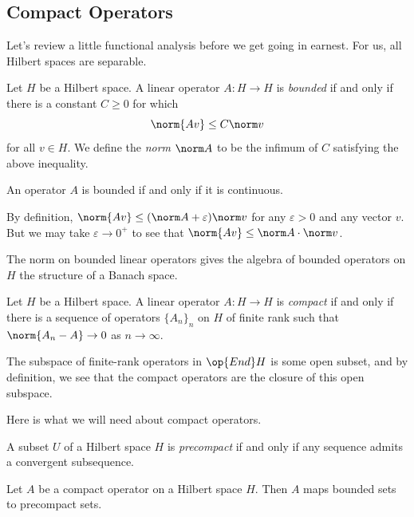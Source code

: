 \documentclass[../notes.tex]{subfiles}
\begin{document}
\subsection{Compact Operators}
Let's review a little functional analysis before we get going in earnest. For us, all Hilbert spaces are separable.
\begin{definition}[bounded]
	Let $H$ be a Hilbert space. A linear operator $A\colon H\to H$ is \textit{bounded} if and only if there is a constant $C\ge0$ for which
	\[\norm{Av}\le C\norm v\]
	for all $v\in H$. We define the \textit{norm} $\norm A$ to be the infimum of $C$ satisfying the above inequality.
\end{definition}
\begin{remark}
	An operator $A$ is bounded if and only if it is continuous.
\end{remark}
\begin{remark}
	By definition, $\norm{Av}\le(\norm A+\varepsilon)\norm v$ for any $\varepsilon>0$ and any vector $v$. But we may take $\varepsilon\to0^+$ to see that $\norm{Av}\le\norm A\cdot\norm v$.
\end{remark}
\begin{remark}
	The norm on bounded linear operators gives the algebra of bounded operators on $H$ the structure of a Banach space.
\end{remark}
\begin{definition}[compact]
	Let $H$ be a Hilbert space. A linear operator $A\colon H\to H$ is \textit{compact} if and only if there is a sequence of operators $\{A_n\}_n$ on $H$ of finite rank such that $\norm{A_n-A}\to0$ as $n\to\infty$.
\end{definition}
\begin{remark}
	The subspace of finite-rank operators in $\op{End}H$ is some open subset, and by definition, we see that the compact operators are the closure of this open subspace.
\end{remark}
Here is what we will need about compact operators.
\begin{definition}[precompact]
	A subset $U$ of a Hilbert space $H$ is \textit{precompact} if and only if any sequence admits a convergent subsequence.
\end{definition}
\begin{lemma} \label{lem:compact-to-precompact}
	Let $A$ be a compact operator on a Hilbert space $H$. Then $A$ maps bounded sets to precompact sets.
\end{lemma}
\end{document}
